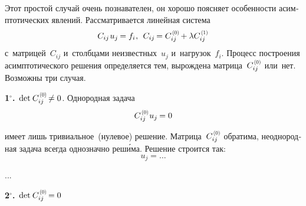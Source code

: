 \begin{otherlanguage}{russian}
Этот простой случай очень познавателен, он хорошо поясняет особенности асимптотических явлений. Рассматривается линейная система
\begin{equation}
C_{ij} \hspace{.2ex} u_{j} \hspace{-0.16ex} = f_{i} \hspace{.1ex} , \:\:
C_{ij} \hspace{-0.2ex} = C_{ij}^{\hspace{0.2ex}\scalebox{0.66}[0.66]{(0)}} \hspace{-0.2ex} + \lambda C_{ij}^{\hspace{0.2ex}\scalebox{0.66}[0.66]{(1)}}
\end{equation}
\noindent с~матрицей~$C_{ij}$ и~столбцами неизвестных~$u_j$ и~нагрузок~$f_i$. Процесс построения асимптотического решения определяется тем, вырождена матрица~${C_{ij}^{\hspace{0.2ex}\scalebox{0.66}[0.66]{(0)}}}$ или~нет. Возможны три случая.

\indent \textbf{1$^{\circ}$\hspace{-1ex}.}\, ${\operatorname{det} \hspace{.16ex} C_{ij}^{\hspace{0.2ex}\scalebox{0.66}[0.66]{(0)}} \hspace{-0.25ex} \neq 0}$. Однородная задача
\vspace{-0.2em}\begin{equation}
C_{ij}^{\hspace{0.2ex}\scalebox{0.66}[0.66]{(0)}} \hspace{.1ex} u_{j} \hspace{-0.16ex} = 0
\end{equation}

\vspace{-0.5em} \noindent имеет лишь тривиальное~(нулевое) решение.
Матрица~${C_{ij}^{\hspace{0.2ex}\scalebox{0.66}[0.66]{(0)}}}$ обратима, неоднородная задача всегда однозначно реш\'{и}ма. Решение строится так:
\begin{equation}
u_{j} = \ldots
\end{equation}

...


\indent \textbf{2$^{\circ}$\hspace{-1ex}.}\, ${\operatorname{det} \hspace{.16ex} C_{ij}^{\hspace{0.2ex}\scalebox{0.66}[0.66]{(0)}} \hspace{-0.25ex} = 0}$


\end{otherlanguage}
